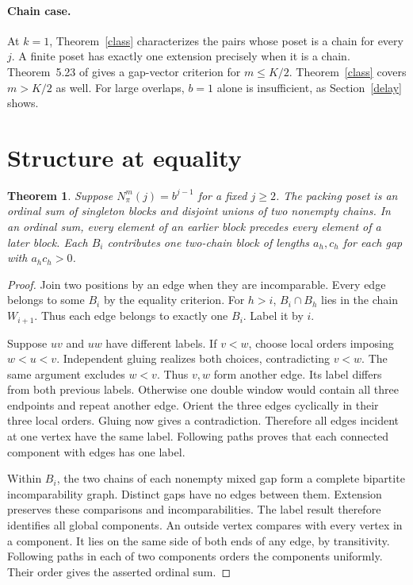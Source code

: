 \documentclass[11pt]{article}
\newtheorem{theorem}{Theorem}
\newcommand{\N}{N_\pi^m}
\begin{document}
\paragraph{Chain case.}
At $k=1$, Theorem~\ref{class} characterizes the pairs whose poset is a chain for every $j$.
A finite poset has exactly one extension precisely when it is a chain.
Theorem~5.23 of \cite{bks} gives a gap-vector criterion for $m\le K/2$.
Theorem~\ref{class} covers $m>K/2$ as well.
For large overlaps, $b=1$ alone is insufficient, as Section~\ref{delay} shows.

\section{Structure at equality}
\begin{theorem}\label{blocks}
Suppose $\N(j)=b^{j-1}$ for a fixed $j\ge2$.
The packing poset is an ordinal sum of singleton blocks and disjoint unions of two nonempty chains.
In an ordinal sum, every element of an earlier block precedes every element of a later block.
Each $B_i$ contributes one two-chain block of lengths $a_h,c_h$ for each gap with $a_hc_h>0$.
\end{theorem}

\begin{proof}
Join two positions by an edge when they are incomparable.
Every edge belongs to some $B_i$ by the equality criterion.
For $h>i$, $B_i\cap B_h$ lies in the chain $W_{i+1}$.
Thus each edge belongs to exactly one $B_i$. Label it by $i$.

Suppose $uv$ and $uw$ have different labels.
If $v<w$, choose local orders imposing $w<u<v$.
Independent gluing realizes both choices, contradicting $v<w$.
The same argument excludes $w<v$. Thus $v,w$ form another edge.
Its label differs from both previous labels. Otherwise one double window would contain all three endpoints and repeat another edge.
Orient the three edges cyclically in their three local orders. Gluing now gives a contradiction.
Therefore all edges incident at one vertex have the same label.
Following paths proves that each connected component with edges has one label.

Within $B_i$, the two chains of each nonempty mixed gap form a complete bipartite incomparability graph.
Distinct gaps have no edges between them. Extension preserves these comparisons and incomparabilities.
The label result therefore identifies all global components.
An outside vertex compares with every vertex in a component.
It lies on the same side of both ends of any edge, by transitivity.
Following paths in each of two components orders the components uniformly. Their order gives the asserted ordinal sum.
\end{proof}
\end{document}
